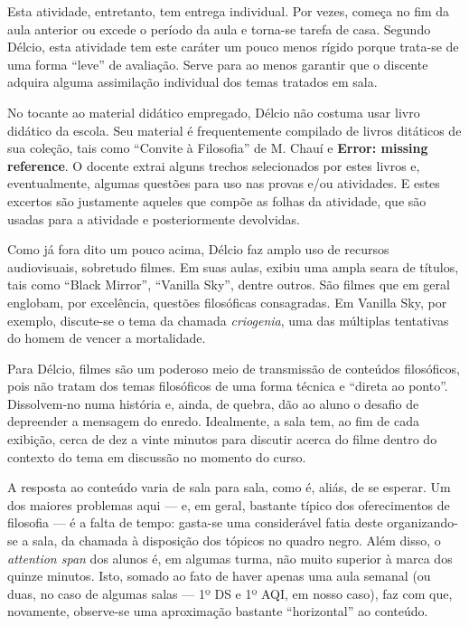 \documentclass[12pt,a4paper]{article}
\begin{document}
    Esta atividade, entretanto, tem entrega individual. Por vezes, começa no 
    fim da aula anterior ou excede o período da aula e torna-se tarefa de casa. 
    Segundo Délcio, esta atividade tem este caráter um pouco menos rígido 
    porque trata-se de uma forma ``leve'' de avaliação. Serve para ao menos 
    garantir que o discente adquira alguma assimilação individual dos temas 
    tratados em sala. 
    
    No tocante ao material didático empregado, Délcio não costuma usar livro 
    didático da escola. Seu material é frequentemente compilado de livros 
    ditáticos de sua coleção, tais como ``Convite à Filosofia'' de M. Chauí e 
    \textbf{Error: missing reference}. O docente extrai alguns trechos 
    selecionados por estes livros e, eventualmente, algumas questões para uso 
    nas provas e/ou atividades. E estes excertos são justamente aqueles que 
    compõe as folhas da atividade, que são usadas para a atividade e 
    posteriormente devolvidas. 
    
    Como já fora dito um pouco acima, Délcio faz amplo uso de recursos 
    audiovisuais, sobretudo filmes. Em suas aulas, exibiu uma ampla seara 
    de títulos, tais como ``Black Mirror'', ``Vanilla Sky'', dentre outros. 
    São filmes que em geral englobam, por excelência, questões filosóficas 
    consagradas. Em Vanilla Sky, por exemplo, discute-se o tema da chamada 
    \textit{criogenia}, uma das múltiplas tentativas do homem de vencer a 
    mortalidade. 
    
    Para Délcio, filmes são um poderoso meio de transmissão de conteúdos 
    filosóficos, pois não tratam dos temas filosóficos de uma forma técnica e 
    ``direta ao ponto''. Dissolvem-no numa história e, ainda, de quebra, dão ao 
    aluno o desafio de depreender a mensagem do enredo. Idealmente, a sala tem, 
    ao fim de cada exibição, cerca de dez a vinte minutos para discutir acerca 
    do filme dentro do contexto do tema em discussão no momento do curso. 
    
    A resposta ao conteúdo varia de sala para sala, como é, aliás, de se 
    esperar. Um dos maiores problemas aqui --- e, em geral, bastante típico 
    dos oferecimentos de filosofia --- é a falta de tempo: gasta-se 
    uma considerável fatia deste organizando-se a sala, da chamada à disposição 
    dos tópicos no quadro negro. Além disso, o \textit{attention span} dos 
    alunos é, em algumas turma, não muito superior à marca dos quinze minutos. 
    Isto, somado ao fato de haver apenas uma aula semanal (ou duas, no caso de 
    algumas salas --- 1º DS e 1º AQI, em nosso caso), faz com que, novamente, 
    observe-se uma aproximação bastante ``horizontal'' ao conteúdo. 
    	
\end{document}
